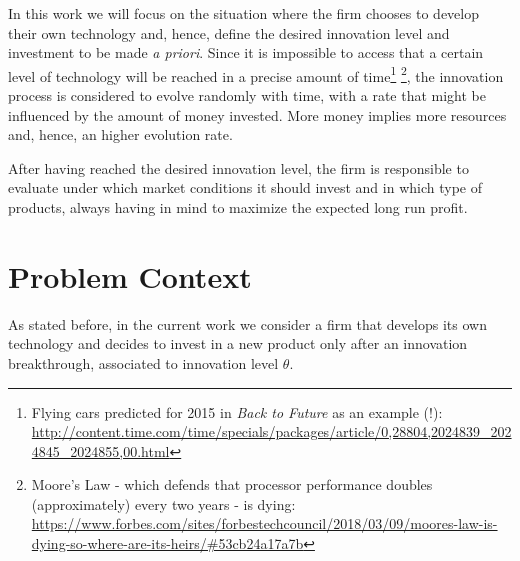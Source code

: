 In this work we will focus on the situation where the firm chooses to develop their own technology and, hence, define the desired innovation level and investment to be made \textit{a priori}. Since it is impossible to access that a certain level of technology will be reached in a precise amount of time\footnote{Flying cars predicted for 2015 in \textit{Back to Future} as an example (!):\\  \url{http://content.time.com/time/specials/packages/article/0,28804,2024839_2024845_2024855,00.html}} \footnote{Moore's Law - which defends that processor performance doubles (approximately) every two years - is dying:\\
\url{https://www.forbes.com/sites/forbestechcouncil/2018/03/09/moores-law-is-dying-so-where-are-its-heirs/\#53cb24a17a7b}}, the innovation process is considered to evolve randomly with time, with a rate that might be influenced by the amount of money invested. More money implies more resources and, hence, an higher evolution rate.

After having reached the desired innovation level, the firm is responsible to evaluate under which market conditions it should invest and in which type of products, always having in mind to maximize the expected long run profit.




\section{Problem Context}
\label{section:context}

As stated before, in the current work we consider a firm that develops its own technology and decides to invest in a new product only after an innovation breakthrough, associated to innovation level $\theta$.

